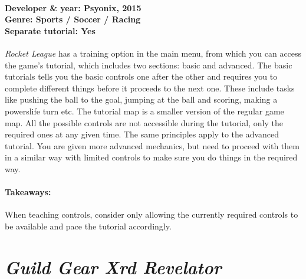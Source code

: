 \paragraph{Developer \& year: Psyonix, 2015 \\ Genre: Sports / Soccer / Racing \\ Separate tutorial: Yes \\}
\textit{Rocket League} has a training option in the main menu, from which you can access the game's tutorial, which includes two sections: basic and advanced.
The basic tutorials tells you the basic controls one after the other and requires you to complete different things before it proceeds to the next one. These include tasks like pushing the ball to the goal, jumping at the ball and scoring, making a powerslife turn etc. The tutorial map is a smaller version of the regular game map. All the possible controls are not accessible during the tutorial, only the required ones at any given time.
The same principles apply to the advanced tutorial. You are given more advanced mechanics, but need to proceed with them in a similar way with limited controls to make sure you do things in the required way.
\paragraph{Takeaways:}
When teaching controls, consider only allowing the currently required controls to be available and pace the tutorial accordingly.

\section{\textit{Guild Gear Xrd Revelator}}
